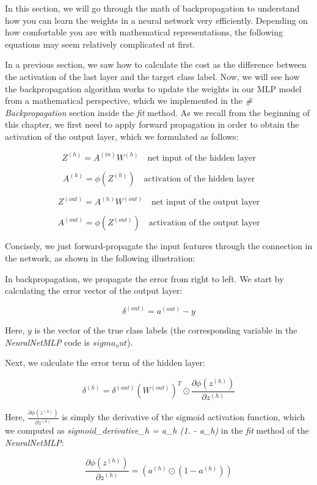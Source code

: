 \documentclass[11pt]{article}
\begin{document}
    In this section, we will go through the math of backpropagation to
understand how you can learn the weights in a neural network very
efficiently. Depending on how comfortable you are with mathematical
representations, the following equations may seem relatively complicated
at first.

In a previous section, we saw how to calculate the cost as the
difference between the activation of the last layer and the target class
label. Now, we will see how the backpropagation algorithm works to
update the weights in our MLP model from a mathematical perspective,
which we implemented in the \emph{\# Backpropagation} section inside the
\emph{fit} method. As we recall from the beginning of this chapter, we
first need to apply forward propagation in order to obtain the
activation of the output layer, which we formulated as follows:

\[Z^{(h)} = A^{(in)}W^{(h)} \quad \text{net input of the hidden layer}\]

\[A^{(h)} = \phi(Z^{(h)}) \quad \text{activation of the hidden layer}\]

\[Z^{(out)} = A^{(h)}W^{(out)} \quad \text{net input of the output layer}\]

\[A^{(out)} = \phi(Z^{(out)}) \quad \text{activation of the output layer}\]

Concisely, we just forward-propagate the input features through the
connection in the network, as shown in the following illustration:

In backpropagation, we propagate the error from right to left. We start
by calculating the error vector of the output layer:

\[\delta^{(out)} = a^{(out)} - y\]

Here, \(y\) is the vector of the true class labels (the corresponding
variable in the \emph{NeuralNetMLP} code is \(sigma_out\)).

Next, we calculate the error term of the hidden layer:

\[\delta^{(h)} = \delta^{(out)}(W^{(out)})^T \odot \frac{\partial \phi(z^{(h)})}{\partial z^{(h)}}\]

Here, \(\frac{\partial \phi(z^{(h)})}{\partial z^{(h)}}\) is simply the
derivative of the sigmoid activation function, which we computed as
\emph{sigmoid\_derivative\_h = a\_h (1. - a\_h)} in the \emph{fit}
method of the \emph{NeuralNetMLP}:

\[\frac{\partial \phi(z^{(h)})}{\partial z^{(h)}} = (a^{(h)} \odot (1 - a^{(h)}))\]
\end{document}
